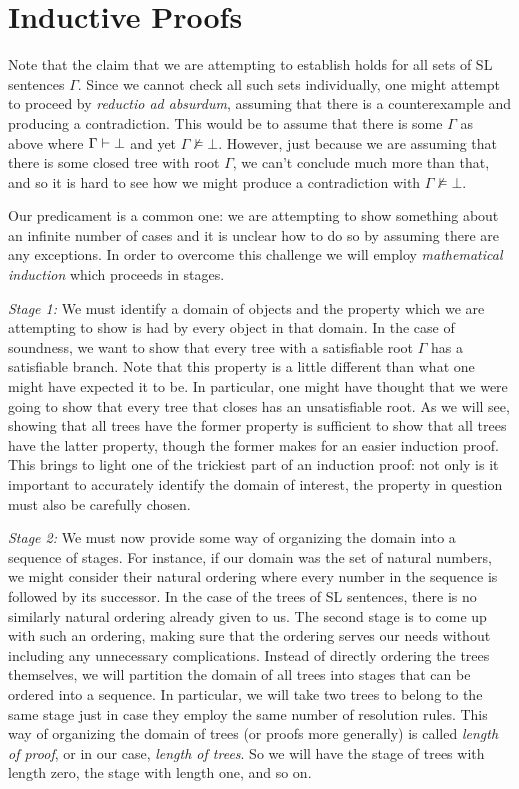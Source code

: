 \section{Inductive Proofs}

Note that the claim that we are attempting to establish holds for all sets of SL sentences $\Gamma$.
Since we cannot check all such sets individually, one might attempt to proceed by \textit{reductio ad absurdum}, assuming that there is a counterexample and producing a contradiction.
This would be to assume that there is some $\Gamma$ as above where $\Gamma \vdash \bot$ and yet $\Gamma \nvDash \bot$.
However, just because we are assuming that there is some closed tree with root $\Gamma$, we can't conclude much more than that, and so it is hard to see how we might produce a contradiction with $\Gamma \nvDash \bot$.

Our predicament is a common one: we are attempting to show something about an infinite number of cases and it is unclear how to do so by assuming there are any exceptions.
In order to overcome this challenge we will employ \emph{mathematical induction} which proceeds in stages.

\textit{Stage 1:} 
We must identify a domain of objects and the property which we are attempting to show is had by every object in that domain.
In the case of soundness, we want to show that every tree with a satisfiable root $\Gamma$ has a satisfiable branch.
Note that this property is a little different than what one might have expected it to be.
In particular, one might have thought that we were going to show that every tree that closes has an unsatisfiable root.
As we will see, showing that all trees have the former property is sufficient to show that all trees have the latter property, though the former makes for an easier induction proof.
This brings to light one of the trickiest part of an induction proof: not only is it important to accurately identify the domain of interest, the property in question must also be carefully chosen.

\textit{Stage 2:} 
We must now provide some way of organizing the domain into a sequence of stages.
For instance, if our domain was the set of natural numbers, we might consider their natural ordering where every number in the sequence is followed by its successor.
In the case of the trees of SL sentences, there is no similarly natural ordering already given to us.
The second stage is to come up with such an ordering, making sure that the ordering serves our needs without including any unnecessary complications.
Instead of directly ordering the trees themselves, we will partition the domain of all trees into stages that can be ordered into a sequence.
In particular, we will take two trees to belong to the same stage just in case they employ the same number of resolution rules.
This way of organizing the domain of trees (or proofs more generally) is called \textit{length of proof}, or in our case, \textit{length of trees}.
So we will have the stage of trees with length zero, the stage with length one, and so on.

